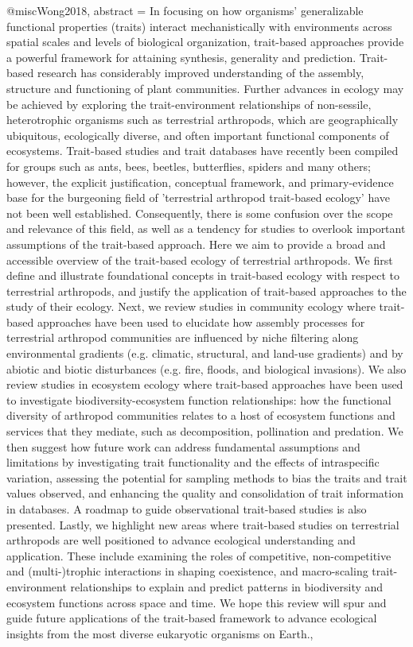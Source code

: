{{@misc{Wong2018,
abstract = {In focusing on how organisms' generalizable functional properties (traits) interact mechanistically with environments across spatial scales and levels of biological organization, trait-based approaches provide a powerful framework for attaining synthesis, generality and prediction. Trait-based research has considerably improved understanding of the assembly, structure and functioning of plant communities. Further advances in ecology may be achieved by exploring the trait-environment relationships of non-sessile, heterotrophic organisms such as terrestrial arthropods, which are geographically ubiquitous, ecologically diverse, and often important functional components of ecosystems. Trait-based studies and trait databases have recently been compiled for groups such as ants, bees, beetles, butterflies, spiders and many others; however, the explicit justification, conceptual framework, and primary-evidence base for the burgeoning field of 'terrestrial arthropod trait-based ecology' have not been well established. Consequently, there is some confusion over the scope and relevance of this field, as well as a tendency for studies to overlook important assumptions of the trait-based approach. Here we aim to provide a broad and accessible overview of the trait-based ecology of terrestrial arthropods. We first define and illustrate foundational concepts in trait-based ecology with respect to terrestrial arthropods, and justify the application of trait-based approaches to the study of their ecology. Next, we review studies in community ecology where trait-based approaches have been used to elucidate how assembly processes for terrestrial arthropod communities are influenced by niche filtering along environmental gradients (e.g. climatic, structural, and land-use gradients) and by abiotic and biotic disturbances (e.g. fire, floods, and biological invasions). We also review studies in ecosystem ecology where trait-based approaches have been used to investigate biodiversity-ecosystem function relationships: how the functional diversity of arthropod communities relates to a host of ecosystem functions and services that they mediate, such as decomposition, pollination and predation. We then suggest how future work can address fundamental assumptions and limitations by investigating trait functionality and the effects of intraspecific variation, assessing the potential for sampling methods to bias the traits and trait values observed, and enhancing the quality and consolidation of trait information in databases. A roadmap to guide observational trait-based studies is also presented. Lastly, we highlight new areas where trait-based studies on terrestrial arthropods are well positioned to advance ecological understanding and application. These include examining the roles of competitive, non-competitive and (multi-)trophic interactions in shaping coexistence, and macro-scaling trait-environment relationships to explain and predict patterns in biodiversity and ecosystem functions across space and time. We hope this review will spur and guide future applications of the trait-based framework to advance ecological insights from the most diverse eukaryotic organisms on Earth.},
}}}
